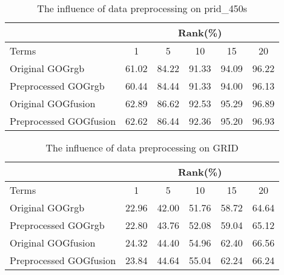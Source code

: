 \begin{table}[H]
\centering
\caption{The influence of data preprocessing on prid\_450s}
\begin{tabular}{|l|c|c|c|c|c|}
\hline
 & \multicolumn{5}{|c|}{Rank(\%)} \\
 \hline
Terms  &1 &5 & 10 &15& 20\\
\hline
Original GOGrgb&61.02& 84.22& 91.33& 94.09& 96.22\\
\hline
Preprocessed GOGrgb &60.44& 84.44& 91.33& 94.00& 96.13\\
\hline
Original GOGfusion &62.89& 86.62& 92.53& 95.29& 96.89\\
\hline
Preprocessed GOGfusion &62.62& 86.44& 92.36& 95.20& 96.93\\
 \hline
 
\end{tabular}
\end{table}
\begin{table}[H]
\centering
\caption{The influence of data preprocessing on GRID}
\begin{tabular}{|l|c|c|c|c|c|}
\hline
 & \multicolumn{5}{|c|}{Rank(\%)} \\
 \hline
Terms  &1 &5 & 10 &15& 20\\
\hline
Original GOGrgb&22.96& 42.00& 51.76& 58.72& 64.64\\
\hline
Preprocessed GOGrgb &22.80& 43.76& 52.08& 59.04& 65.12\\
\hline
Original GOGfusion &24.32& 44.40& 54.96& 62.40& 66.56\\
\hline
Preprocessed GOGfusion &23.84& 44.64& 55.04& 62.24& 66.24\\
 \hline
 
\end{tabular}
\end{table}

